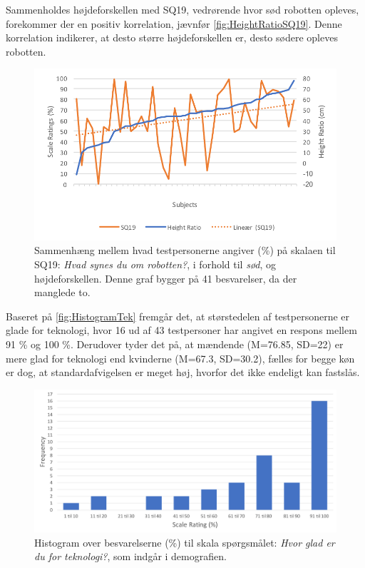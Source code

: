 \noindent
%
Sammenholdes højdeforskellen med SQ19, vedrørende hvor sød robotten opleves, forekommer der en positiv korrelation, jævnfør \autoref{fig:HeightRatioSQ19}. Denne korrelation indikerer, at desto større højdeforskellen er, desto sødere opleves robotten. 
%
\begin{figure}[H]
\centering
\includegraphics[width=\textwidth]{Figure/DatabehandlingSkalaer/Demografi/HeightRatioSQ19}
\caption{Sammenhæng mellem hvad testpersonerne angiver (\%) på skalaen til SQ19: \textit{Hvad synes du om robotten?}, i forhold til \textit{sød}, og højdeforskellen. Denne graf bygger på 41 besvarelser, da der manglede to.}
\label{fig:HeightRatioSQ19}
\end{figure}
\noindent
%
Baseret på \autoref{fig:HistogramTek} fremgår det, at størstedelen af testpersonerne er glade for teknologi, hvor 16 ud af 43 testpersoner har angivet en respons mellem 91 \% og 100 \%. Derudover tyder det på, at mændende (M=76.85, SD=22) er mere glad for teknologi end kvinderne (M=67.3, SD=30.2), fælles for begge køn er dog, at standardafvigelsen er meget høj, hvorfor det ikke endeligt kan fastslås. 
%
\begin{figure}[H]
\centering
\includegraphics[width = \textwidth]{Figure/DatabehandlingSkalaer/DataPresentation/HistogramTek} 
\caption{Histogram over besvarelserne (\%) til skala spørgsmålet: \textit{Hvor glad er du for teknologi?}, som indgår i demografien.}
\label{fig:HistogramTek}
\end{figure}
